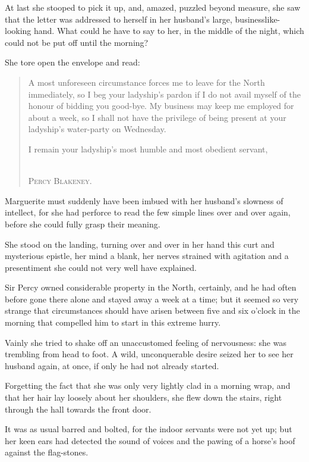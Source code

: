 At last she stooped to pick it up, and, amazed, puzzled beyond measure, she saw that the letter was addressed to herself in her husband's large, businesslike-looking hand. What could he have to say to her, in the middle of the night, which could not be put off until the morning?

She tore open the envelope and read:\longdash

\blockquote{
A most unforeseen circumstance forces me to leave for the North immediately, so I beg your ladyship's pardon if I do not avail myself of the honour of bidding you good-bye. My business may keep me employed for about a week, so I shall not have the privilege of being present at your ladyship's water-party on Wednesday.\\
\begin{flushright}
\hfill\begin{minipage}{0.65\linewidth}I remain your ladyship's most humble and most obedient servant,\end{minipage}\\
\vspace{10pt}
\textsc{Percy Blakeney.}
\end{flushright}
}
Marguerite must suddenly have been imbued with her husband's slowness of intellect, for she had perforce to read the few simple lines over and over again, before she could fully grasp their meaning.

She stood on the landing, turning over and over in her hand this curt and mysterious epistle, her mind a blank, her nerves strained with agitation and a presentiment she could not very well have explained.

Sir Percy owned considerable property in the North, certainly, and he had often before gone there alone and stayed away a week at a time; but it seemed so very strange that circumstances should have arisen between five and six o'clock in the morning that compelled him to start in this extreme hurry.

Vainly she tried to shake off an unaccustomed feeling of nervousness: she was trembling from head to foot. A wild, unconquerable desire seized her to see her husband again, at once, if only he had not already started.

Forgetting the fact that she was only very lightly clad in a morning wrap, and that her hair lay loosely about her shoulders, she flew down the stairs, right through the hall towards the front door.

It was as usual barred and bolted, for the indoor servants were not yet up; but her keen ears had detected the sound of voices and the pawing of a horse's hoof against the flag-stones.

